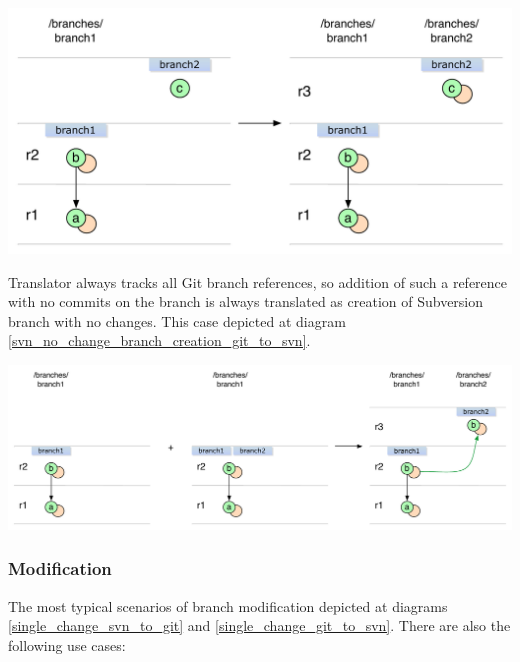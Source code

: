 \begin{center}
\includegraphics[width=\linewidth]{img/diagrams/branch_creation_no_history_git_to_svn.pdf}%
\label{branch_creation_no_history_git_to_svn}%
\end{center}

Translator always tracks all Git branch references, so addition of such a reference with no commits on the branch is always translated as creation of Subversion branch with no changes. This case depicted at diagram \ref{svn_no_change_branch_creation_git_to_svn}.
\begin{center}
\includegraphics[width=\linewidth]{img/diagrams/svn_no_change_branch_creation_git_to_svn.pdf}%
\label{svn_no_change_branch_creation_git_to_svn}%
\end{center}

\subsubsection{Modification}

The most typical scenarios of branch modification depicted at diagrams \ref{single_change_svn_to_git} and \ref{single_change_git_to_svn}. There are also the following use cases:

